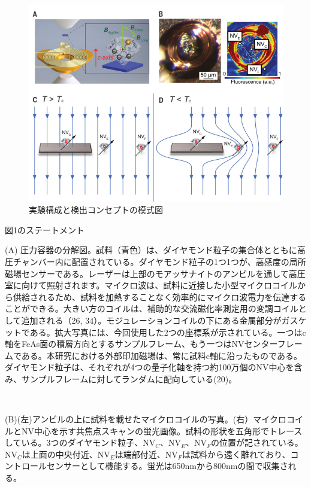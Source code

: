 \documentclass[dvipdfmx]{jsarticle}
\begin{document}
\newpage

\begin{figure}[h]
\centering
\includegraphics[width=12cm]{fig1.png}
\caption{実験構成と検出コンセプトの模式図}
\end{figure}%

図1のステートメント

(A) 圧力容器の分解図。試料（青色）は、ダイヤモンド粒子の集合体とともに高圧チャンバー内に配置されている。ダイヤモンド粒子の1つ1つが、高感度の局所磁場センサーである。レーザーは上部のモアッサナイトのアンビルを通して高圧室に向けて照射されます。マイクロ波は、試料に近接した小型マイクロコイルから供給されるため、試料を加熱することなく効率的にマイクロ波電力を伝達することができる。大きい方のコイルは、補助的な交流磁化率測定用の変調コイルとして追加される（26, 34）。モジュレーションコイルの下にある金属部分がガスケットである。拡大写真には、今回使用した2つの座標系が示されている。一つはc軸をFeAs面の積層方向とするサンプルフレーム、もう一つはNVセンターフレームである。本研究における外部印加磁場は、常に試料c軸に沿ったものである。ダイヤモンド粒子は、それぞれが4つの量子化軸を持つ約100万個のNV中心を含み、サンプルフレームに対してランダムに配向している(20)。

　　

(B)(左)アンビルの上に試料を載せたマイクロコイルの写真。(右）マイクロコイルとNV中心を示す共焦点スキャンの蛍光画像。試料の形状を五角形でトレースしている。3つのダイヤモンド粒子、NV$_{C}$、NV$_{E}$、NV$_{F}$の位置が記されている。NV$_{C}$は上面の中央付近、NV$_{E}$は端部付近、NV$_{F}$は試料から遠く離れており、コントロールセンサーとして機能する。蛍光は650nmから800nmの間で収集される。

　　
\end{document}
